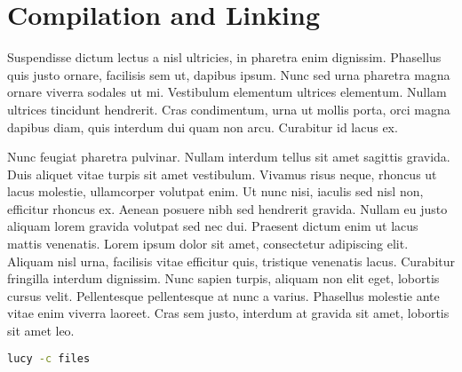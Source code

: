 \section{Compilation and Linking}
Suspendisse dictum lectus a nisl ultricies, in pharetra enim dignissim. Phasellus quis justo ornare, facilisis sem ut, dapibus ipsum. Nunc sed urna pharetra magna ornare viverra sodales ut mi. Vestibulum elementum ultrices elementum. Nullam ultrices tincidunt hendrerit. Cras condimentum, urna ut mollis porta, orci magna dapibus diam, quis interdum dui quam non arcu. Curabitur id lacus ex.

Nunc feugiat pharetra pulvinar. Nullam interdum tellus sit amet sagittis gravida. Duis aliquet vitae turpis sit amet vestibulum. Vivamus risus neque, rhoncus ut lacus molestie, ullamcorper volutpat enim. Ut nunc nisi, iaculis sed nisl non, efficitur rhoncus ex. Aenean posuere nibh sed hendrerit gravida. Nullam eu justo aliquam lorem gravida volutpat sed nec dui. Praesent dictum enim ut lacus mattis venenatis. Lorem ipsum dolor sit amet, consectetur adipiscing elit. Aliquam nisl urna, facilisis vitae efficitur quis, tristique venenatis lacus. Curabitur fringilla interdum dignissim. Nunc sapien turpis, aliquam non elit eget, lobortis cursus velit. Pellentesque pellentesque at nunc a varius. Phasellus molestie ante vitae enim viverra laoreet. Cras sem justo, interdum at gravida sit amet, lobortis sit amet leo.
\begin{lstlisting}[language=Bash]
  lucy -c files
\end{lstlisting}
